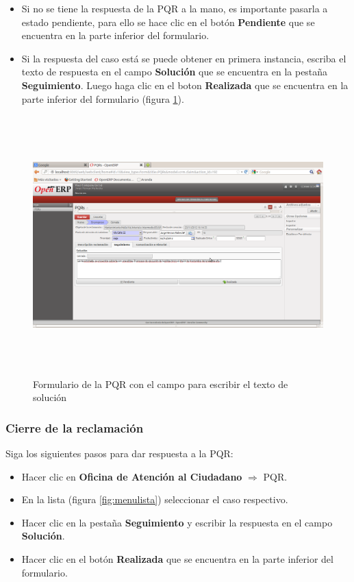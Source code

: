 \begin{itemize}
 \item Si no se tiene la respuesta de la PQR a la mano, es importante pasarla a estado pendiente, para ello se hace clic en el botón \textbf{Pendiente} 
que se encuentra en la parte inferior del formulario. 
\item Si la respuesta del caso está se puede obtener en primera instancia, escriba el texto de respuesta en el campo \textbf{Solución} 
que se encuentra en la pestaña \textbf{Seguimiento}. Luego haga clic en el boton \textbf{Realizada} 
que se encuentra en la parte inferior del formulario (figura \ref{fig:formseguimiento}).
\end{itemize}

\begin{figure}[H]
 \centering
 \includegraphics[width=17cm,height=10cm]{./Imagenes/formseguimiento.png}
 \caption{Formulario de la PQR con el campo para escribir el texto de solución}
 \label{fig:formseguimiento}
\end{figure}


\subsubsection{Cierre de la reclamación}


Siga los siguientes pasos para dar respuesta a la PQR:

\begin{itemize}
 \item Hacer clic en \textbf{Oficina de Atención al Ciudadano} $\Rightarrow$ PQR.
 \item En la lista (figura \ref{fig:menulista}) seleccionar el caso respectivo.
 \item Hacer clic en la pestaña \textbf{Seguimiento} y escribir la respuesta en el campo \textbf{Solución}.
 \item Hacer clic en el botón \textbf{Realizada} que se encuentra en la parte inferior del formulario. 
\end{itemize}

